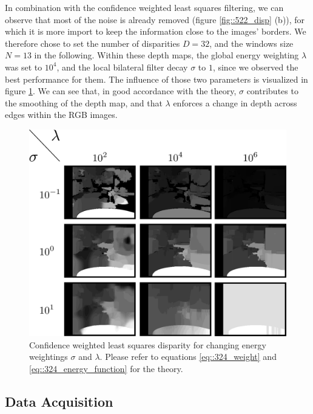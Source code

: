 In combination with the confidence weighted least squares filtering, we can observe that most of the noise is already removed (figure \ref{fig::522_disp} (b)), for which it is more import to keep the information close to the images' borders. We therefore chose to set the number of disparities $D=32$, and the windows size $N=13$ in the following. Within these depth maps, the global energy weighting $\lambda$ was set to $10^4$, and the local bilateral filter decay $\sigma$ to $1$, since we observed the best performance for them. The influence of those two parameters is visualized in figure \ref{fig::522_sigma_lambda}. We can see that, in good accordance with the theory, $\sigma$ contributes to the smoothing of the depth map, and that $\lambda$ enforces a change in depth across edges within the RGB images.
\begin{figure}[h]
	\centering
	\includegraphics[scale=.2]{chapters/05_experiments/02_autonomous_walking/02_depth_map_parameter_tuning/sigma_lambda.png}
	\caption{Confidence weighted least squares disparity for changing energy weightings $\sigma$ and $\lambda$. Please refer to equations \ref{eq::324_weight} and \ref{eq::324_energy_function} for the theory.}
	\label{fig::522_sigma_lambda}
\end{figure}
\subsection{Data Acquisition}
\label{sec::523_da}

